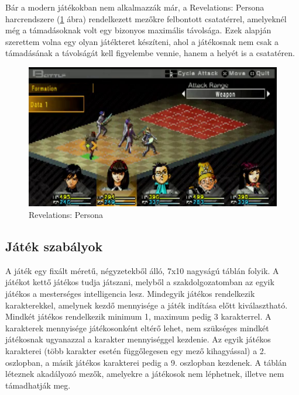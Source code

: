 \documentclass[
]{thesis-ekf}
\theoremstyle{definition}
\theoremstyle{remark}
\begin{document}
Bár a modern játékokban nem alkalmazzák már, a Revelations: Persona harcrendszere (\ref{persona1} ábra) rendelkezett mezőkre felbontott csatatérrel, amelyeknél még a támadásoknak volt egy bizonyos maximális távolsága. Ezek alapján szerettem volna egy olyan játékteret készíteni, ahol a játékosnak nem csak a támadásának a távolságát kell figyelembe vennie, hanem a helyét is a csatatéren. \cite{Persona1,Persona1Gameplay}
\begin{figure}[h!]
	\centering
	\includegraphics[width=13cm]{./pictures/persona_psp.png}
	\caption{Revelations: Persona}
	\label{persona1}
\end{figure}

\subsection{Játék szabályok} \label{rules}

A játék egy fixált méretű, négyzetekből álló, 7x10 nagyságú táblán folyik. A játékot kettő játékos tudja játszani, melyből a szakdolgozatomban az egyik játékos a mesterséges intelligencia lesz. Mindegyik játékos rendelkezik karakterekkel, amelynek kezdő mennyisége a játék indítása előtt kiválasztható. Mindkét játékos rendelkezik minimum 1, maximum pedig 3 karakterrel. A karakterek mennyisége játékosonként eltérő lehet, nem szükséges mindkét játékosnak ugyanazzal a karakter mennyiséggel kezdenie. Az egyik játékos karakterei (több karakter esetén függőlegesen egy mező kihagyással) a 2. oszlopban, a másik játékos karakterei pedig a 9. oszlopban kezdenek. A táblán léteznek akadályozó mezők, amelyekre a játékosok nem léphetnek, illetve nem támadhatják meg. 
\end{document}
